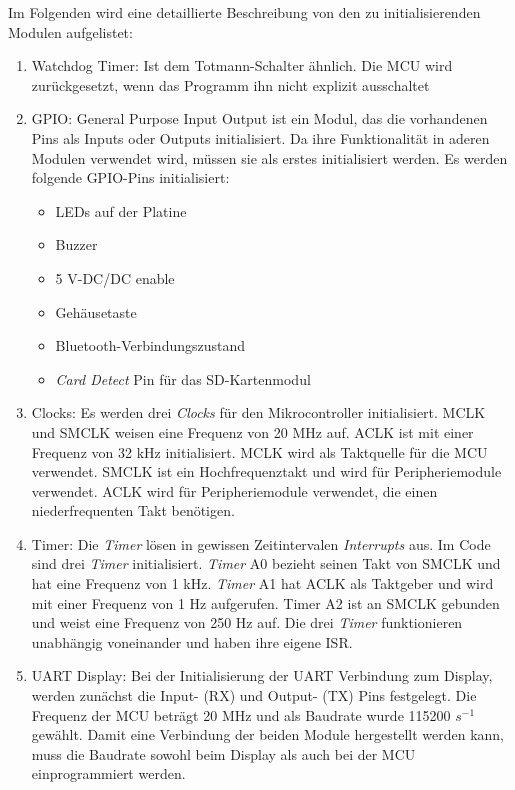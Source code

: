 Im Folgenden wird eine detaillierte Beschreibung von den zu initialisierenden Modulen aufgelistet:
\begin{enumerate}
    \item Watchdog Timer: Ist dem Totmann-Schalter ähnlich. Die MCU wird zurückgesetzt, wenn das Programm ihn nicht explizit ausschaltet \cite{Watchdog_Timer}
    \item GPIO: General Purpose Input Output ist ein Modul, das die vorhandenen Pins als Inputs oder Outputs initialisiert. Da ihre Funktionalität in aderen Modulen verwendet wird, müssen sie als erstes initialisiert werden. Es werden folgende GPIO-Pins initialisiert:
    \begin{itemize}
        \item LEDs auf der Platine
        \item Buzzer
        \item 5 V-DC/DC enable
        \item Gehäusetaste
        \item Bluetooth-Verbindungszustand
        \item \textit{Card Detect} Pin für das SD-Kartenmodul
    \end{itemize}
    \item Clocks: Es werden drei \textit{Clocks}  für den Mikrocontroller initialisiert. MCLK und SMCLK weisen eine Frequenz von 20 MHz auf. ACLK ist mit einer Frequenz von 32 kHz initialisiert.
    MCLK wird als Taktquelle für die MCU verwendet. SMCLK ist ein Hochfrequenztakt und wird für Peripheriemodule verwendet. ACLK wird für Peripheriemodule verwendet, die einen niederfrequenten Takt benötigen.
    \item Timer: Die \textit{Timer} lösen in gewissen Zeitintervalen \textit{Interrupts} aus. Im Code sind drei \textit{Timer} initialisiert. \textit{Timer} A0 bezieht seinen Takt von SMCLK und hat eine Frequenz von 1 kHz. \textit{Timer} A1 hat ACLK als Taktgeber und wird mit einer Frequenz von 1 Hz aufgerufen. Timer A2 ist an SMCLK gebunden und weist eine Frequenz von 250 Hz auf. Die drei \textit{Timer} funktionieren unabhängig voneinander und haben ihre eigene ISR.
    \item UART Display: Bei der Initialisierung der UART Verbindung zum Display, werden zunächst die Input- (RX) und Output- (TX) Pins festgelegt. Die Frequenz der MCU beträgt 20 MHz und als Baudrate wurde 115200 $s^{-1}$ gewählt. Damit eine Verbindung der beiden Module hergestellt werden kann, muss die Baudrate sowohl beim Display als auch bei der MCU einprogrammiert werden.\\

\end{enumerate}
